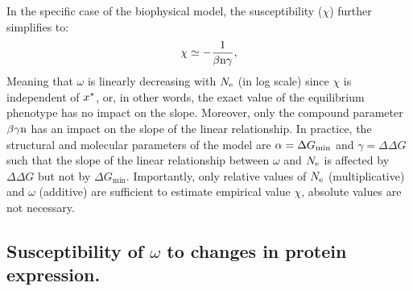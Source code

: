 \documentclass{MBE}%
\begin{document}
In the specific case of the biophysical model, the susceptibility ($\chi$) further simplifies to:
\begin{gather}
 \chi \simeq -\dfrac{1}{\beta \Nsite \gamma}, \label{eq:chi_application}
\end{gather}
Meaning that $\omega$ is linearly decreasing with $N_{\mathrm{e}}$ (in log scale) since $\chi$ is independent of $x^{*}$, or, in other words, the exact value of the equilibrium phenotype has no impact on the slope.
Moreover, only the compound parameter $\beta \gamma \text{n}$ has an impact on the slope of the linear relationship.
In practice, the structural and molecular parameters of the model are $\alpha = \Delta G_{\text{min}}$ and $\gamma = \Delta \Delta G$ such that the slope of the linear relationship between $\omega$ and $N_{\mathrm{e}}$ is affected by $\Delta \Delta G$ but not by $\Delta G_{\text{min}}$.
Importantly, only relative values of $N_{\mathrm{e}}$ (multiplicative) and $\omega$ (additive) are sufficient to estimate empirical value $\chi$, absolute values are not necessary.
\subsection*{Susceptibility of $\omega$ to changes in protein expression.}

\label{sec:expression}
\end{document}
